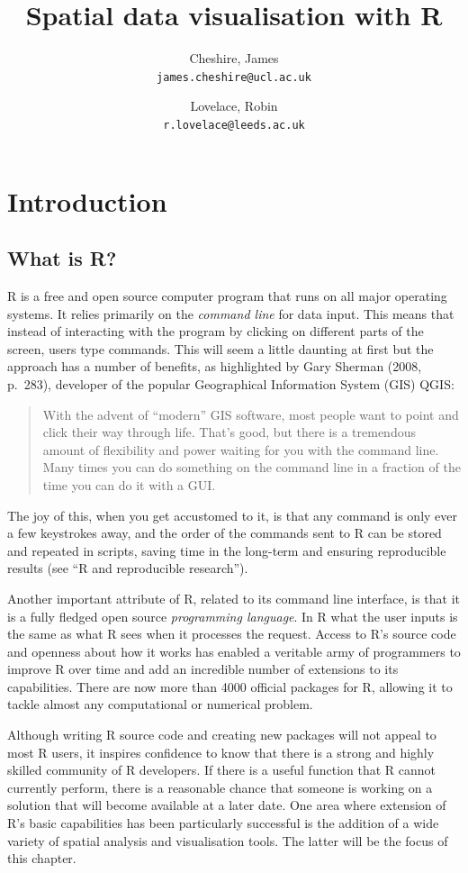 \documentclass[]{article}
\author{
Cheshire, James\\
\texttt{james.cheshire@ucl.ac.uk}
\and
Lovelace, Robin\\
\texttt{r.lovelace@leeds.ac.uk}
}
\title{Spatial data visualisation with R}
\author{}
\date{}
\begin{document}
\section{Introduction}

\subsection{What is R?}

R is a free and open source computer program that runs on all major
operating systems. It relies primarily on the \emph{command line} for
data input. This means that instead of interacting with the program by
clicking on different parts of the screen, users type commands. This
will seem a little daunting at first but the approach has a number of
benefits, as highlighted by Gary Sherman (2008, p.~283), developer of
the popular Geographical Information System (GIS) QGIS:

\begin{quote}
With the advent of ``modern'' GIS software, most people want to point
and click their way through life. That's good, but there is a tremendous
amount of flexibility and power waiting for you with the command line.
Many times you can do something on the command line in a fraction of the
time you can do it with a GUI.
\end{quote}

The joy of this, when you get accustomed to it, is that any command is
only ever a few keystrokes away, and the order of the commands sent to R
can be stored and repeated in scripts, saving time in the long-term and
ensuring reproducible results (see ``R and reproducible research'').

Another important attribute of R, related to its command line interface,
is that it is a fully fledged open source \emph{programming language}.
In R what the user inputs is the same as what R sees when it processes
the request. Access to R's source code and openness about how it works
has enabled a veritable army of programmers to improve R over time and
add an incredible number of extensions to its capabilities. There are
now more than 4000 official packages for R, allowing it to tackle almost
any computational or numerical problem.

Although writing R source code and creating new packages will not appeal
to most R users, it inspires confidence to know that there is a strong
and highly skilled community of R developers. If there is a useful
function that R cannot currently perform, there is a reasonable chance
that someone is working on a solution that will become available at a
later date. One area where extension of R's basic capabilities has been
particularly successful is the addition of a wide variety of spatial
analysis and visualisation tools. The latter will be the focus of this
chapter.
\end{document}
